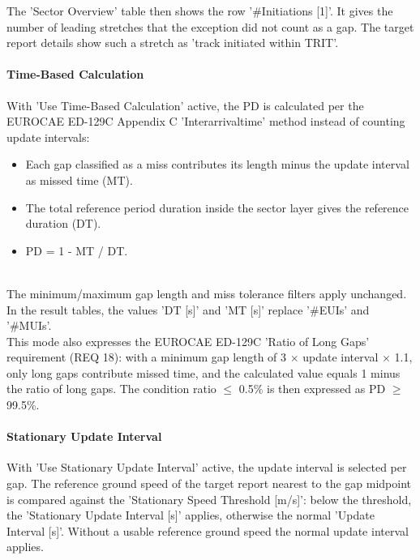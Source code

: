 The 'Sector Overview' table then shows the row '\#Initiations [1]'. It gives the number of leading stretches that the exception did not count as a gap. The target report details show such a stretch as 'track initiated within TRIT'. \\

\paragraph{Time-Based Calculation}

With 'Use Time-Based Calculation' active, the PD is calculated per the EUROCAE ED-129C Appendix C 'Interarrivaltime' method instead of counting update intervals:
\begin{itemize}
\item Each gap classified as a miss contributes its length minus the update interval as missed time (MT).
\item The total reference period duration inside the sector layer gives the reference duration (DT).
\item PD = 1 - MT / DT.
\end{itemize}
\ \\

The minimum/maximum gap length and miss tolerance filters apply unchanged. In the result tables, the values 'DT [s]' and 'MT [s]' replace '\#EUIs' and '\#MUIs'. \\

This mode also expresses the EUROCAE ED-129C 'Ratio of Long Gaps' requirement (REQ 18): with a minimum gap length of 3 $\times$ update interval $\times$ 1.1, only long gaps contribute missed time, and the calculated value equals 1 minus the ratio of long gaps. The condition ratio $\leq$ 0.5\% is then expressed as PD $\geq$ 99.5\%. \\

\paragraph{Stationary Update Interval}

With 'Use Stationary Update Interval' active, the update interval is selected per gap. The reference ground speed of the target report nearest to the gap midpoint is compared against the 'Stationary Speed Threshold [m/s]': below the threshold, the 'Stationary Update Interval [s]' applies, otherwise the normal 'Update Interval [s]'. Without a usable reference ground speed the normal update interval applies. \\

